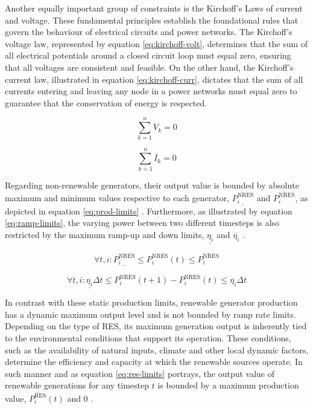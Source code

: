 Another equally important group of constraints is the Kirchoff's Laws of current and voltage. These fundamental principles establish the foundational rules that govern the behaviour of electrical circuits and power networks. The Kirchoff's voltage law, represented by equation \ref{eq:kirchoff-volt}, determines that the sum of all electrical potentials around a closed circuit loop must equal zero, ensuring that all voltages are consistent and feasible. On the other hand, the Kirchoff's current law, illustrated in equation \ref{eq:kirchoff-curr}, dictates that the sum of all currents entering and leaving any node in a power networks must equal zero to guarantee that the conservation of energy is respected. 

\begin{equation} \label{eq:kirchoff-volt}
	\sum_{k=1}^n  V_k = 0
\end{equation}

\begin{equation} \label{eq:kirchoff-curr}
	\sum_{k=1}^n  I_k = 0
\end{equation}


Regarding non-renewable generators, their output value is bounded by absolute maximum and minimum values respective to each generator, $\underline{P^\text{NRES}_i}$ and $\overline{P^\text{NRES}_i}$, as depicted in equation \ref{eq:prod-limits} \cite{chenScalableGraphReinforcement2023, liNovelGraphReinforcement2022, liuDistributedEconomicDispatch2018}. Furthermore, as illustrated by equation \ref{eq:ramp-limits}, the varying power between two different timesteps is also restricted by the maximum ramp-up and down limits, $\underline{\eta_i }$ and $\overline{\eta_i }$ \cite{chenScalableGraphReinforcement2023, liNovelGraphReinforcement2022}. \par

\begin{equation} \label{eq:prod-limits}
	\forall t, i: \underline{P^\text{NRES}_i} \leq P^\text{NRES}_i(t) \leq \overline{P^\text{NRES}_i}
\end{equation}

\begin{equation} \label{eq:ramp-limits}
	\forall t, i: \underline{\eta_i } \Delta t \leq P^\text{NRES}_i (t + 1) - P^\text{NRES}_i (t) \leq \overline{\eta_i} \Delta t
\end{equation}

In contrast with these static production limits, renewable generator production has a dynamic maximum output level and is not bounded by ramp rate limits. Depending on the type of \ac{RES}, its maximum generation output is inherently tied to the environmental conditions that support its operation. These conditions, such as the availability of natural inputs, climate and other local dynamic factors, determine the efficiency and capacity at which the renewable sources operate. In such manner and as equation \ref{eq:res-limits} portrays, the output value of renewable generations for any timestep $t$ is bounded by a maximum production value, $\overline{P^\text{RES}_i} (t)$ and 0 \cite{chenScalableGraphReinforcement2023, liNovelGraphReinforcement2022}.

